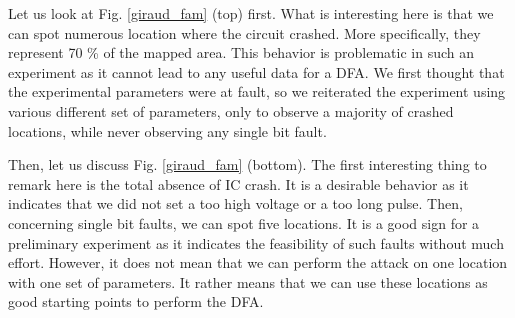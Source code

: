 			Let us look at Fig. \ref{giraud_fam} (top) first.
			What is interesting here is that we can spot numerous location where the circuit crashed.
			More specifically, they represent 70 \% of the mapped area.
			This behavior is problematic in such an experiment as it cannot lead to any useful data for a DFA.
			We first thought that the experimental parameters were at fault, so we reiterated the experiment using various different set of parameters, only to observe a majority of crashed locations, while never observing any single bit fault.

			Then, let us discuss Fig. \ref{giraud_fam} (bottom).
			The first interesting thing to remark here is the total absence of IC crash.
			It is a desirable behavior as it indicates that we did not set a too high voltage or a too long pulse.
			Then, concerning single bit faults, we can spot five locations.
			It is a good sign for a preliminary experiment as it indicates the feasibility of such faults without much effort.
			However, it does not mean that we can perform the attack on one location with one set of parameters.
			It rather means that we can use these locations as good starting points to perform the DFA.

